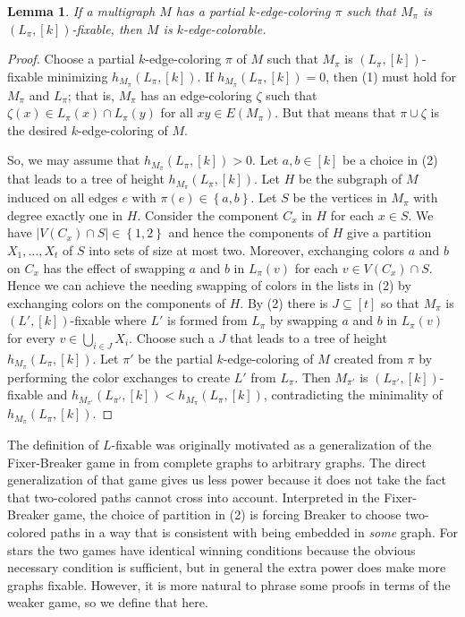 \documentclass[12pt]{article}
\theoremstyle{plain}
\newtheorem{lem}[thm]{Lemma}
\theoremstyle{definition}
\theoremstyle{remark}
\newcommand{\set}[1]{\left\{ #1 \right\}}
\newcommand{\card}[1]{\left|#1\right|}
\newcommand{\irange}[1]{\left[#1\right]}
\newcommand{\parens}[1]{\left( #1 \right)}
\begin{document}
\begin{lem}\label{FixableCompletesColoring}
If a multigraph $M$ has a partial $k$-edge-coloring $\pi$ such that $M_\pi$ is $(L_\pi, \irange{k})$-fixable, then $M$ is $k$-edge-colorable.
\end{lem}
\begin{proof}
Choose a partial $k$-edge-coloring $\pi$ of $M$ such that $M_\pi$ is $(L_\pi, \irange{k})$-fixable minimizing $h_{M_\pi}\parens{L_\pi, \irange{k}}$. If $h_{M_\pi}\parens{L_\pi, \irange{k}} = 0$, then (1) must hold for $M_\pi$ and $L_\pi$; that is, $M_\pi$ has an edge-coloring $\zeta$ such that $\zeta(x) \in L_\pi(x) \cap L_\pi(y)$ for all $xy \in E(M_\pi)$.  But that means that $\pi \cup \zeta$ is the desired $k$-edge-coloring of $M$.  

So, we may assume that $h_{M_\pi}\parens{L_\pi, \irange{k}} > 0$.  Let $a,b \in \irange{k}$ be a choice in (2) that leads to a tree of height $h_{M_\pi}\parens{L_\pi, \irange{k}}$.  Let $H$ be the subgraph of $M$ induced on all edges $e$ with $\pi(e) \in \set{a,b}$.  Let $S$ be the vertices in $M_\pi$ with degree exactly one in $H$.  Consider the component $C_x$ in $H$ for each $x \in S$.  We have $\card{V(C_x) \cap S} \in \set{1,2}$ and hence the components of $H$ give a partition $X_1, \ldots, X_t$ of $S$ into sets of size at most two.  Moreover, exchanging colors $a$ and $b$ on $C_x$ has the effect of swapping $a$ and $b$ in $L_\pi(v)$ for each $v \in V(C_x) \cap S$.  Hence we can achieve the needing swapping of colors in the lists in (2) by exchanging colors on the components of $H$.  By (2) there is $J \subseteq \irange{t}$ so that $M_\pi$ is $(L', \irange{k})$-fixable where $L'$ is formed from $L_\pi$ by swapping $a$ and $b$ in $L_\pi(v)$ for every $v \in \bigcup_{i \in J} X_i$.  Choose such a $J$ that leads to a tree of height $h_{M_\pi}\parens{L_\pi, \irange{k}}$.  Let $\pi'$ be the partial $k$-edge-coloring of $M$ created from $\pi$ by performing the color exchanges to create $L'$ from $L_\pi$.  Then $M_{\pi'}$ is $(L_{\pi'}, \irange{k})$-fixable and $h_{M_{\pi'}}\parens{L_{\pi'}, \irange{k}} < h_{M_\pi}\parens{L_\pi, \irange{k}}$, contradicting the minimality of $h_{M_\pi}\parens{L_\pi, \irange{k}}$.
\end{proof}

The definition of $L$-fixable was originally motivated as a generalization of the Fixer-Breaker game in \cite{HallGame} from complete graphs to arbitrary graphs.  
The direct generalization of that game gives us less power because it does not take the fact that two-colored paths cannot cross into account.  Interpreted in the Fixer-Breaker game, the choice of partition
in (2) is forcing Breaker to choose two-colored paths in a way that is consistent with being embedded in \emph{some} graph.  For stars the two games have identical winning conditions because the obvious necessary condition is sufficient, but in general the extra power does make more graphs fixable.  However, it is more natural to phrase some proofs in terms of the weaker game, so we define that here.
\end{document}
